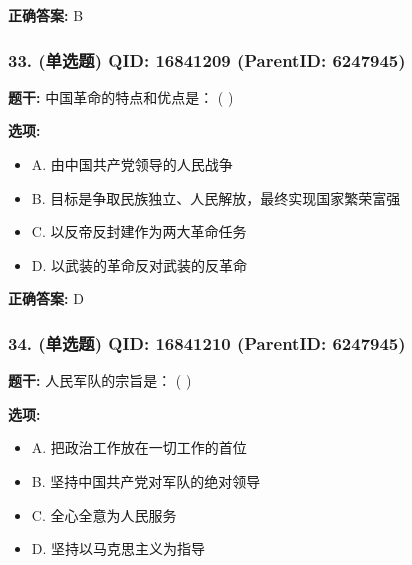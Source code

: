 \documentclass[12pt,UTF8]{ctexart}
\begin{document}
\textbf{正确答案:}
B

\vspace{0.3em}\hrulefill\vspace{0.7em}

\subsubsection*{33. (单选题) \small QID: 16841209 (ParentID: 6247945)}

\textbf{题干:}
中国革命的特点和优点是： ( )



\textbf{选项:}
\begin{itemize}[leftmargin=*]

  \item A. 由中国共产党领导的人民战争

  \item B. 目标是争取民族独立、人民解放，最终实现国家繁荣富强

  \item C. 以反帝反封建作为两大革命任务

  \item D. 以武装的革命反对武装的反革命

\end{itemize}

\textbf{正确答案:}
D

\vspace{0.3em}\hrulefill\vspace{0.7em}

\subsubsection*{34. (单选题) \small QID: 16841210 (ParentID: 6247945)}

\textbf{题干:}
人民军队的宗旨是： ( )



\textbf{选项:}
\begin{itemize}[leftmargin=*]

  \item A. 把政治工作放在一切工作的首位

  \item B. 坚持中国共产党对军队的绝对领导

  \item C. 全心全意为人民服务

  \item D. 坚持以马克思主义为指导

\end{itemize}
\end{document}
